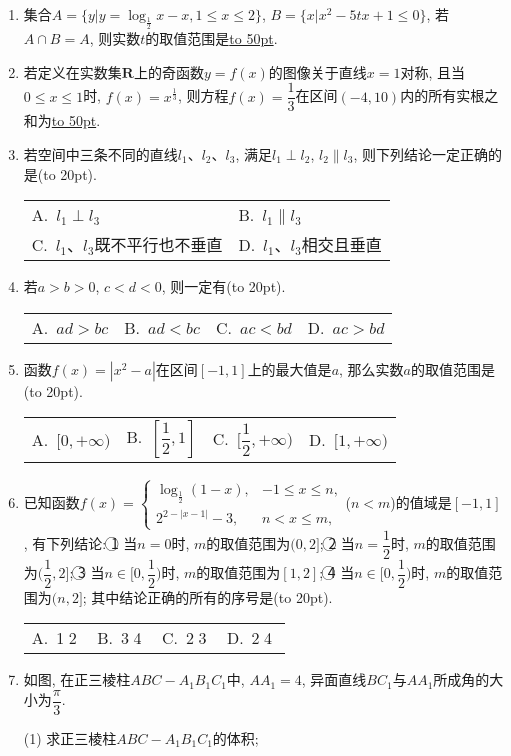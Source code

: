 \documentclass[10pt,a4paper]{article}
\newcommand{\blank}[1]{\underline{\hbox to #1pt{}}}
\newcommand{\bracket}[1]{(\hbox to #1pt{})}
\newcommand{\twoch}[4]{\par\begin{tabular}{p{.46\textwidth}p{.46\textwidth}}
A.~#1& B.~#2\\
C.~#3& D.~#4
\end{tabular}}
\newcommand{\fourch}[4]{\par\begin{tabular}{p{.23\textwidth}p{.23\textwidth}p{.23\textwidth}p{.23\textwidth}}
A.~#1 &B.~#2& C.~#3& D.~#4
\end{tabular}}
\begin{document}
\begin{enumerate}[1.]
\item 集合$A=\{y|y=\log_{\frac 12}x-x,1\le x\le 2\}$, $B=\{x|x^2-5tx+1\le 0\}$, 若$A\cap B=A$, 则实数$t$的取值范围是\blank{50}.
\item 若定义在实数集$\mathbf{R}$上的奇函数$y=f(x)$的图像关于直线$x=1$对称, 且当$0\le x\le 1$时, $f(x)=x^{\frac 13}$, 则方程$f(x)=\dfrac 13$在区间$(-4,10)$内的所有实根之和为\blank{50}.
\item 若空间中三条不同的直线$l_1$、$l_2$、$l_3$, 满足$l_1\perp l_2$, $l_2\parallel l_3$, 则下列结论一定正确的是\bracket{20}.
\twoch{$l_1\perp l_3$}{$l_1\parallel l_3$}{$l_1$、$l_3$既不平行也不垂直}{$l_1$、$l_3$相交且垂直}
\item 若$a>b>0$, $c<d<0$, 则一定有\bracket{20}.
\fourch{$ad>bc$}{$ad<bc$}{$ac<bd$}{$ac>bd$}
\item 函数$f(x)=|x^2-a|$在区间$[-1,1]$上的最大值是$a$, 那么实数$a$的取值范围是\bracket{20}.
\fourch{$[0,+\infty)$}{$[\dfrac 12,1]$}{$[\dfrac 12,+\infty)$}{$[1,+\infty)$}
\item 已知函数$f(x)=\begin{cases}\log_{\frac 12}(1-x), & -1\le x\le n,  \\ 2^{2-|x-1|}-3, & n<x\le m,  \end{cases}$($n<m$)的值域是$[-1,1]$, 有下列结论:
\textcircled{1} 当$n=0$时, $m$的取值范围为$(0,2]$; \textcircled{2}  当$n=\dfrac 12$时, $m$的取值范围为$(\dfrac 12,2]$; \textcircled{3}  当$n\in [0,\dfrac 12)$时, $m$的取值范围为$[1,2]$; \textcircled{4}  当$n\in [0,\dfrac 12)$时, $m$的取值范围为$(n,2]$;
其中结论正确的所有的序号是\bracket{20}.
\fourch{\textcircled{1}\textcircled{2}}{\textcircled{3}\textcircled{4}}{\textcircled{2}\textcircled{3}}{\textcircled{2}\textcircled{4}}
\item 如图, 在正三棱柱$ABC-A_1B_1C_1$中, $AA_1=4$, 异面直线$BC_1$与$AA_1$所成角的大小为$\dfrac{\pi}3$.
\begin{center}
\end{center}
(1) 求正三棱柱$ABC-A_1B_1C_1$的体积;\\

\end{enumerate}
\end{document}
